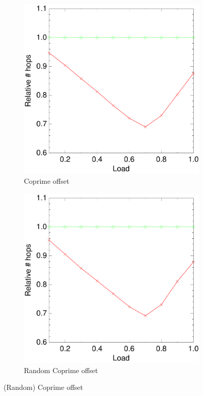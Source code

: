 \documentclass[10pt,a4paper]{article}
\begin{document}
\begin{figure}[h!tb]
        \begin{subfigure}[b]{0.5\textwidth}
                \centering
                \includegraphics[width=\textwidth]{data/primeright.pdf}
                \caption{Coprime offset}
        \end{subfigure}
        \begin{subfigure}[b]{0.5\textwidth}
                \centering
                \includegraphics[width=\textwidth]{data/randprimeright.pdf}
                \caption{Random Coprime offset}
                \label{figsimrcp}
        \end{subfigure}
\caption{(Random) Coprime offset}
\label{figprimes}
\end{figure}
\end{document}
